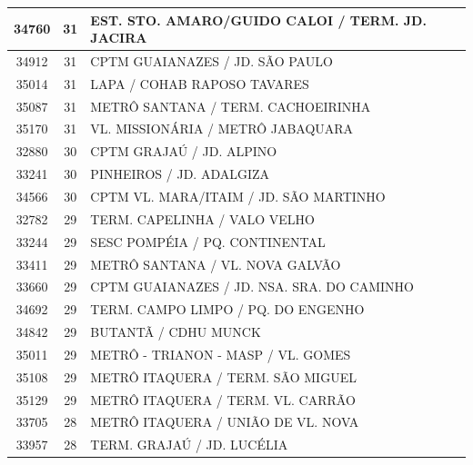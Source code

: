 \documentclass[
	12pt,				%
	oneside,			%
	a4paper,			%
	english,			%
	brazil				%
	]{abntex2ppgsi}
\begin{document}
{{\begin{apendicesenv}
\begin{longtable}{c|c|p{7cm}}
    34760 & 31    & EST. STO. AMARO/GUIDO CALOI / TERM. JD. JACIRA \\
\hline

    34912 & 31    & CPTM GUAIANAZES / JD. SÃO PAULO \\
\hline

    35014 & 31    & LAPA / COHAB RAPOSO TAVARES \\
\hline

    35087 & 31    & METRÔ SANTANA / TERM. CACHOEIRINHA \\
\hline

    35170 & 31    & VL. MISSIONÁRIA / METRÔ JABAQUARA \\
\hline

    32880 & 30    & CPTM GRAJAÚ / JD. ALPINO \\
\hline

    33241 & 30    & PINHEIROS / JD. ADALGIZA \\
\hline

    34566 & 30    & CPTM VL. MARA/ITAIM / JD. SÃO MARTINHO \\
\hline

    32782 & 29    & TERM. CAPELINHA / VALO VELHO \\
\hline

    33244 & 29    & SESC POMPÉIA / PQ. CONTINENTAL \\
\hline

    33411 & 29    & METRÔ SANTANA / VL. NOVA GALVÃO \\
\hline

    33660 & 29    & CPTM GUAIANAZES / JD. NSA. SRA. DO CAMINHO \\
\hline

    34692 & 29    & TERM. CAMPO LIMPO / PQ. DO ENGENHO \\
\hline

    34842 & 29    & BUTANTÃ / CDHU MUNCK \\
\hline

    35011 & 29    & METRÔ - TRIANON - MASP / VL. GOMES \\
\hline

    35108 & 29    & METRÔ ITAQUERA / TERM. SÃO MIGUEL \\
\hline

    35129 & 29    & METRÔ ITAQUERA / TERM. VL. CARRÃO \\
\hline

    33705 & 28    & METRÔ ITAQUERA / UNIÃO DE VL. NOVA \\
\hline

    33957 & 28    & TERM. GRAJAÚ / JD. LUCÉLIA \\
\hline


\end{longtable}
\end{apendicesenv}}}
\end{document}
